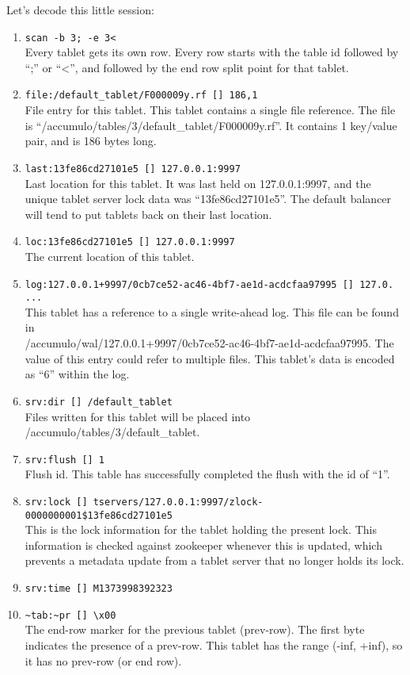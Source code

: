 Let's decode this little session:

\begin{enumerate}
\item{\texttt{scan -b 3; -e 3<}\\
  Every tablet gets its own row. Every row starts with the table id followed by
  ``;'' or ``<'', and followed by the end row split point for that tablet.}
\item{\texttt{file:/default\_tablet/F000009y.rf [] 186,1}\\
  File entry for this tablet.  This tablet contains a single file reference. The
  file is ``/accumulo/tables/3/default\_tablet/F000009y.rf''.  It contains 1
  key/value pair, and is 186 bytes long.}
\item{\texttt{last:13fe86cd27101e5 []    127.0.0.1:9997}\\
  Last location for this tablet.  It was last held on 127.0.0.1:9997, and the
  unique tablet server lock data was ``13fe86cd27101e5''. The default balancer
  will tend to put tablets back on their last location.}
\item{\texttt{loc:13fe86cd27101e5 []    127.0.0.1:9997}\\
  The current location of this tablet.}
\item{\texttt{log:127.0.0.1+9997/0cb7ce52-ac46-4bf7-ae1d-acdcfaa97995 []    127.0. ...}\\
  This tablet has a reference to a single write-ahead log. This file can be found in\\
  /accumulo/wal/127.0.0.1+9997/0cb7ce52-ac46-4bf7-ae1d-acdcfaa97995. The value
  of this entry could refer to multiple files. This tablet's data is encoded as
  ``6'' within the log.}
\item{\texttt{srv:dir []    /default\_tablet}\\
  Files written for this tablet will be placed into
  /accumulo/tables/3/default\_tablet.}
\item{\texttt{srv:flush []    1}\\
  Flush id.  This table has successfully completed the flush with the id of
  ``1''.}
\item{\texttt{srv:lock []    tservers/127.0.0.1:9997/zlock-0000000001\$13fe86cd27101e5}\\
  This is the lock information for the tablet holding the present lock.  This
  information is checked against zookeeper whenever this is updated, which
  prevents a metadata update from a tablet server that no longer holds its
  lock.}
\item{\texttt{srv:time []    M1373998392323} }
\item{\texttt{\textasciitilde{}tab:\textasciitilde{}pr []    \textbackslash{}x00}\\
  The end-row marker for the previous tablet (prev-row).  The first byte
  indicates the presence of a prev-row.  This tablet has the range (-inf, +inf),
  so it has no prev-row (or end row).}
\end{enumerate}


